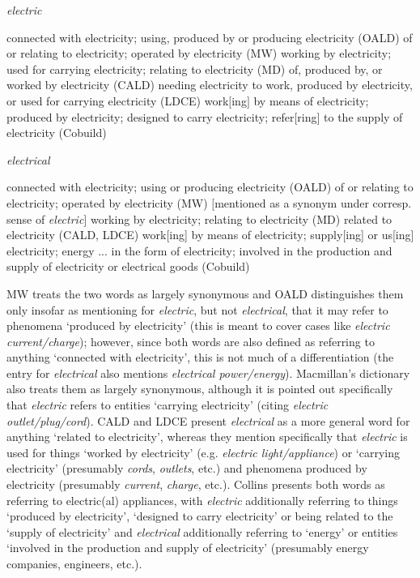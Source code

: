 \begin{exe}
\ex \textit{electric}
\begin{xlist}
\label{ex:definitionelectric}
\ex connected with electricity; using, produced by or producing electricity (OALD)
\ex of or relating to electricity; operated by electricity (MW)
\ex working by electricity; used for carrying electricity; relating to electricity (MD)
\ex of, produced by, or worked by electricity (CALD)
\ex needing electricity to work, produced by electricity, or used for carrying electricity (LDCE)
\ex work$[$ing$]$ by means of electricity; produced by electricity; designed to carry electricity; refer$[$ring$]$ to the supply of electricity (Cobuild)
\end{xlist}

\ex \textit{electrical}
\begin{xlist}
\label{ex:definitionelectrical}
\ex connected with electricity; using or producing electricity (OALD)
\ex of or relating to electricity; operated by electricity (MW) $[$mentioned as a synonym under corresp. sense of \textit{electric}$]$
\ex working by electricity; relating to electricity (MD)
\ex related to electricity (CALD, LDCE)
\ex work[ing] by means of electricity; supply[ing] or us[ing] electricity; energy ... in the form of electricity; involved in the production and supply of electricity or electrical goods (Cobuild)
\end{xlist}
\end{exe}

MW treats the two words as largely synonymous  and OALD distinguishes them only insofar as mentioning for \textit{electric}, but not \textit{electrical}, that it may refer to phenomena `produced by electricity' (this is meant to cover cases like \textit{electric current\slash charge}); however, since both words are also defined as referring to anything `connected with electricity', this is not much of a differentiation (the entry for \textit{electrical} also mentions \textit{electrical power\slash energy}). Macmillan's dictionary  also treats them as largely synonymous,  although it is pointed out specifically that \textit{electric} refers to entities `carrying electricity' (citing \textit{electric outlet\slash plug\slash cord}). CALD and LDCE present \textit{electrical} as a more general word for anything `related to electricity', whereas they mention specifically that \textit{electric} is used for things `worked by electricity' (e.g. \textit{electric light\slash appliance}) or `carrying electricity' (presumably \textit{cords}, \textit{outlets}, etc.) and phenomena produced by electricity (presumably \textit{current}, \textit{charge}, etc.). Collins presents both words as referring to electric(al) appliances, with \textit{electric} additionally referring to things `produced by electricity', `designed to carry electricity' or being related to the `supply of electricity' and \textit{electrical} additionally referring to `energy' or entities `involved in the production and supply of electricity' (presumably energy companies, engineers, etc.).

